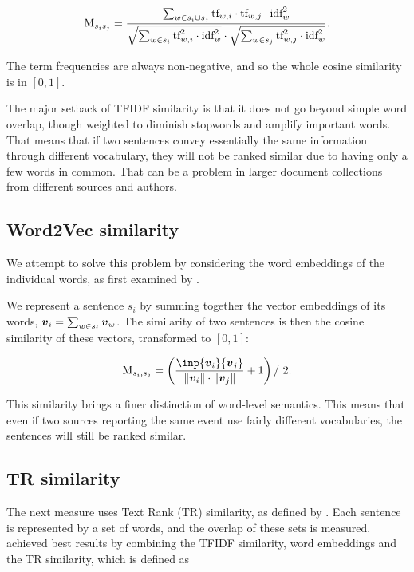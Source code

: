 \begin{equation}
	\text{M}_{s_{i}s_{j}} = \frac{\sum_{w \in s_{i} \cup s_{j}} \text{tf}_{w,i} \cdot \text{tf}_{w,j} \cdot \text{idf}_{w}^{2}}{\sqrt{\sum_{w \in s_{i}} \text{tf}_{w, i}^{2} \cdot \text{idf}_{w}^{2}} \cdot \sqrt{\sum_{w \in s_{j}} \text{tf}_{w, j}^{2} \cdot \text{idf}_{w}^{2}}}.
\end{equation}

The term frequencies are always non-negative, and so the whole cosine similarity is in $[0, 1]$.

The major setback of TFIDF similarity is that it does not go beyond simple word overlap, though weighted to diminish stopwords and amplify important words. That means that if two sentences convey essentially the same information through different vocabulary, they will not be ranked similar due to having only a few words in common. That can be a problem in larger document collections from different sources and authors.

\subsection{Word2Vec similarity}

We attempt to solve this problem by considering the word embeddings of the individual words, as first examined by \cite{mogren-1}.

We represent a sentence $s_{i}$ by summing together the vector embeddings of its words, $\embed_{i} = \sum_{w \in s_{i}} \embed_{w}$. The similarity of two sentences is then the cosine similarity of these vectors, transformed to $[0, 1]$:

\begin{equation}
	\similarity_{s_{i}, s_{j}} = \left(\frac{\inp{\embed_{i}}{\embed_{j}}}{\| \embed_{i} \| \cdot \| \embed_{j} \|} + 1 \right) / \ 2.
\end{equation}

This similarity brings a finer distinction of word-level semantics. This means that even if two sources reporting the same event use fairly different vocabularies, the sentences will still be ranked similar.

\subsection{TR similarity}

The next measure uses Text Rank (TR) similarity, as defined by \cite{textrank}. Each sentence is represented by a set of words, and the overlap of these sets is measured. \cite{mogren-2} achieved best results by combining the TFIDF similarity, word embeddings and the TR similarity, which is defined as

